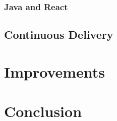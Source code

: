 \documentclass[a4paper,11pt,pdftex,halfparskip,cleardoubleempty]{scrbook}
\begin{document}
\subsubsection{Java and React}

\subsection{Continuous Delivery}

\section{Improvements}

\section{Conclusion}


\nocite{*}



\end{document}
